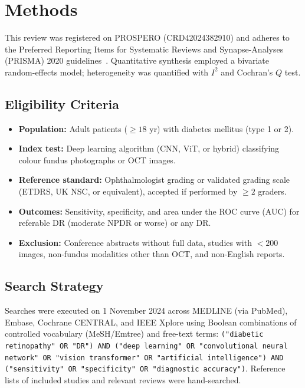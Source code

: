 \section{Methods}

This review was registered on PROSPERO (CRD42024382910) and adheres to the
Preferred Reporting Items for Systematic Reviews and Synapse-Analyses (PRISMA) 2020
guidelines~\cite{Page2021}. Quantitative synthesis employed a bivariate random-effects
model; heterogeneity was quantified with \(I^2\) and Cochran's \(Q\) test.

\subsection{Eligibility Criteria}

\begin{itemize}
  \item \textbf{Population:} Adult patients (\(\geq 18\) yr) with diabetes mellitus (type 1 or 2).
  \item \textbf{Index test:} Deep learning algorithm (CNN, ViT, or hybrid) classifying colour
        fundus photographs or OCT images.
  \item \textbf{Reference standard:} Ophthalmologist grading or validated grading scale
        (ETDRS, UK NSC, or equivalent), accepted if performed by \(\geq 2\) graders.
  \item \textbf{Outcomes:} Sensitivity, specificity, and area under the ROC curve (AUC)
        for referable DR (moderate NPDR or worse) or any DR.
  \item \textbf{Exclusion:} Conference abstracts without full data, studies with
        \(<200\) images, non-fundus modalities other than OCT, and non-English reports.
\end{itemize}

\subsection{Search Strategy}

Searches were executed on 1 November 2024 across MEDLINE (via PubMed),
Embase, Cochrane CENTRAL, and IEEE Xplore using Boolean combinations of controlled
vocabulary (MeSH/Emtree) and free-text terms:
\texttt{("diabetic retinopathy" OR "DR") AND ("deep learning" OR "convolutional neural
network" OR "vision transformer" OR "artificial intelligence") AND
("sensitivity" OR "specificity" OR "diagnostic accuracy")}.
Reference lists of included studies and relevant reviews were hand-searched.

